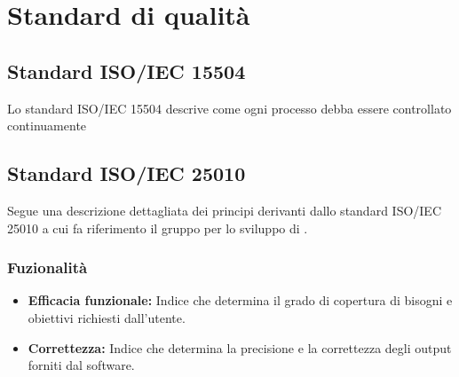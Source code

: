 \chapter{Standard di qualità}
\section{Standard ISO/IEC 15504}
Lo standard ISO/IEC 15504 descrive come ogni processo debba essere controllato continuamente 

\section{Standard ISO/IEC 25010}
Segue una descrizione dettagliata dei principi derivanti dallo standard ISO/IEC 25010 a cui fa riferimento il gruppo per lo sviluppo di .

\subsection{Fuzionalità}
\begin{itemize}
	\item \textbf{Efficacia funzionale:} Indice che determina il grado di copertura di bisogni e obiettivi richiesti dall'utente.
	\item \textbf{Correttezza:} Indice che determina la precisione e la correttezza degli output forniti dal software.
\end{itemize}
